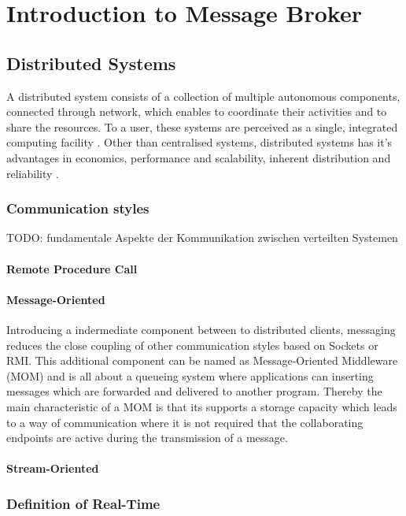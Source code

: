 \chapter{Introduction to Message Broker}
\section{Distributed Systems}
A distributed system consists of a collection of multiple autonomous components,
connected through network, which enables to coordinate their activities and to
share the resources. To a user, these systems are perceived as a single,
integrated computing facility \cite{TAN06}. Other than centralised systems,
distributed systems has it's advantages in economics, performance and
scalability, inherent distribution and reliability \cite{POSA1}.

\subsection{Communication styles}
TODO: fundamentale Aspekte der Kommunikation zwischen verteilten Systemen

\subsubsection{Remote Procedure Call}

\subsubsection{Message-Oriented}
Introducing a indermediate component between to distributed clients, messaging
reduces the close coupling of other communication styles based on Sockets or
RMI. This additional component can be named as Message-Oriented Middleware (MOM)
and is all about a queueing system where applications can inserting messages
which are forwarded and delivered to another program. Thereby the main
characteristic of a MOM is that its supports a storage capacity which leads to a
way of communication where it is not required that the collaborating endpoints
are active during the transmission of a message.\cite{TAN06}
 
\subsubsection{Stream-Oriented}

\subsection{Definition of Real-Time}

